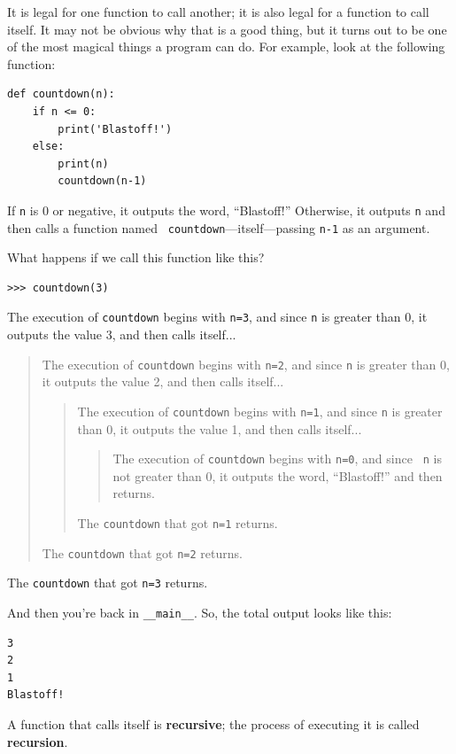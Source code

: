 \documentclass[10pt]{book}
\begin{document}
It is legal for one function to call another;
it is also legal for a function to call itself.  It may not be obvious
why that is a good thing, but it turns out to be one of the most
magical things a program can do.
For example, look at the following function:

\begin{verbatim}
def countdown(n):
    if n <= 0:
        print('Blastoff!')
    else:
        print(n)
        countdown(n-1)
\end{verbatim}
%
If {\tt n} is 0 or negative, it outputs the word, ``Blastoff!''
Otherwise, it outputs {\tt n} and then calls a function named {\tt
countdown}---itself---passing {\tt n-1} as an argument.

What happens if we call this function like this?

\begin{verbatim}
>>> countdown(3)
\end{verbatim}
%
The execution of {\tt countdown} begins with {\tt n=3}, and since
{\tt n} is greater than 0, it outputs the value 3, and then calls itself...

\begin{quote}
The execution of {\tt countdown} begins with {\tt n=2}, and since
{\tt n} is greater than 0, it outputs the value 2, and then calls itself...

\begin{quote}
The execution of {\tt countdown} begins with {\tt n=1}, and since
{\tt n} is greater than 0, it outputs the value 1, and then calls itself...

\begin{quote}
The execution of {\tt countdown} begins with {\tt n=0}, and since {\tt
n} is not greater than 0, it outputs the word, ``Blastoff!'' and then
returns.
\end{quote}

The {\tt countdown} that got {\tt n=1} returns.
\end{quote}

The {\tt countdown} that got {\tt n=2} returns.
\end{quote}

The {\tt countdown} that got {\tt n=3} returns.

And then you're back in \verb"__main__".  So, the
total output looks like this:

\begin{verbatim}
3
2
1
Blastoff!
\end{verbatim}
%
A function that calls itself is {\bf recursive}; the process of
executing it is called {\bf recursion}.
\end{document}
